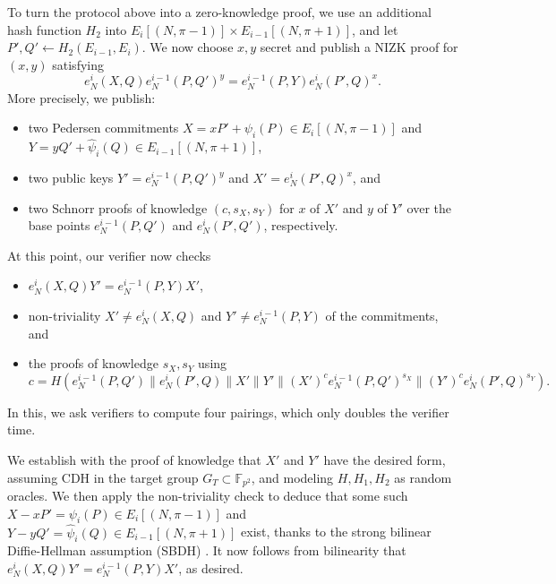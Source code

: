 \documentclass{llncs}
\newcommand{\F}{\mathbb{F}}
\begin{document}
To turn the protocol above into a zero-knowledge proof, we use an
additional hash function $H_2$ into
$E_i[(N,\pi-1)]\times E_{i-1}[(N,\pi+1)]$, and let
$P',Q' \gets H_2(E_{i-1},E_i)$. %
We now choose $x,y$ secret and publish a NIZK proof for $(x,y)$ satisfying
$$ e_N^i(X,Q) e_N^{i-1}(P,Q')^y  = e_N^{i-1}(P,Y) e_N^i(P',Q)^x . $$
More precisely, we publish:
\begin{itemize}
\item two Pedersen commitments 
 $X = x P' + \psi_i(P) \in E_i[(N,\pi-1)]$ and
 $Y = y Q' + \hat\psi_i(Q) \in E_{i-1}[(N,\pi+1)]$,
\item two public keys $Y' = e_N^{i-1}(P,Q')^y$ and $X' = e_N^i(P',Q)^x$, and
\item two Schnorr proofs of knowledge $(c,s_X,s_Y)$ for $x$ of $X'$ and $y$ of $Y'$
over the base points $e_N^{i-1}(P,Q')$ and $e_N^i(P',Q')$, respectively.
\end{itemize}
At this point, our verifier now checks 
\begin{itemize}
\item $e_N^i(X,Q) Y' = e_N^{i-1}(P,Y) X'$,
\item non-triviality $X' \ne e_N^i(X,Q)$ and $Y' \ne e_N^{i-1}(P,Y)$ of the commitments, and
\item the proofs of knowledge $s_X,s_Y$ using
$$ c = H( 
  e_N^{i-1}(P,Q') \| e_N^i(P',Q) \| 
  X' \| Y' \| 
  (X')^c e_N^{i-1}(P,Q')^{s_X} \| 
  (Y')^c e_N^i(P',Q)^{s_Y} 
). $$
\end{itemize}
In this, we ask verifiers to compute four pairings, which only doubles
the verifier time.

We establish with the proof of knowledge that $X'$ and $Y'$ have
the desired form, assuming CDH in the target group $G_T\subset\F_{p^2}$,
and modeling $H,H_1,H_2$ as random oracles.
We then apply the non-triviality check to deduce that some such 
 $X - x P' = \psi_i(P) \in E_i[(N,\pi-1)]$ and
 $Y - y Q' = \hat\psi_i(Q) \in E_{i-1}[(N,\pi+1)]$
exist, thanks to the strong bilinear Diffie-Hellman assumption (SBDH) 
\cite{10.1007/978-3-540-74143-5_24}. 
It now follows from bilinearity that $e_N^i(X,Q)Y' = e_N^{i-1}(P,Y)X'$, as desired.
\end{document}
